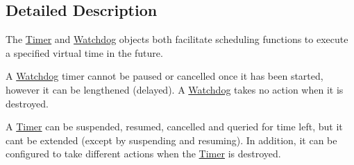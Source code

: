 \subsection{Detailed Description}
The \hyperlink{classns3_1_1Timer}{Timer} and \hyperlink{classns3_1_1Watchdog}{Watchdog} objects both facilitate scheduling functions to execute a specified virtual time in the future.

A \hyperlink{classns3_1_1Watchdog}{Watchdog} timer cannot be paused or cancelled once it has been started, however it can be lengthened (delayed). A \hyperlink{classns3_1_1Watchdog}{Watchdog} takes no action when it is destroyed.

A \hyperlink{classns3_1_1Timer}{Timer} can be suspended, resumed, cancelled and queried for time left, but it can\textquotesingle{}t be extended (except by suspending and resuming). In addition, it can be configured to take different actions when the \hyperlink{classns3_1_1Timer}{Timer} is destroyed. 